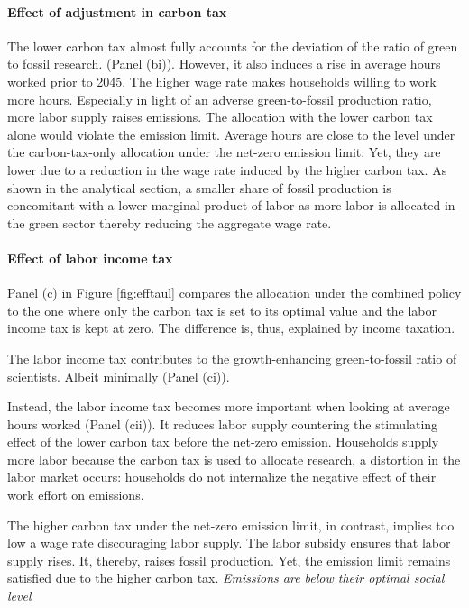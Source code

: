 \paragraph{Effect of adjustment in carbon tax}
The lower carbon tax almost fully accounts for the deviation of the ratio of green to fossil research. (Panel (bi)). However, it also induces a rise in average hours worked prior to 2045. The higher wage rate makes households willing to work more hours. Especially in light of an adverse green-to-fossil production ratio, more labor supply raises emissions. The allocation with the lower carbon tax alone would violate the emission limit. 
Average hours are close to the level under the carbon-tax-only allocation under the net-zero emission limit. Yet, they are lower due to a reduction in the wage rate induced by the higher carbon tax. As shown in the analytical section, a smaller share of fossil production is concomitant with a lower marginal product of labor as more labor is allocated in the green sector thereby reducing the aggregate wage rate. 

\paragraph{Effect of labor income tax}

Panel (c) in Figure \ref{fig:efftaul} compares the allocation under the combined policy to the one where only the carbon tax is set to its optimal value and the labor income tax is kept at zero. The difference is, thus, explained by income taxation. 

The labor income tax contributes to the growth-enhancing green-to-fossil ratio of scientists. Albeit minimally (Panel (ci)). 

Instead, the labor income tax becomes more important when looking at average hours worked (Panel (cii)). It reduces labor supply countering the stimulating effect of the lower carbon tax before the net-zero emission. Households supply more labor because the carbon tax is used to allocate research, a distortion in the labor market occurs: households do not internalize the negative effect of their work effort on emissions. 

The higher carbon tax under the net-zero emission limit, in contrast, implies too low a wage rate discouraging labor supply. The labor subsidy ensures that labor supply rises. It, thereby, raises fossil production. Yet, the emission limit remains satisfied due to the higher carbon tax.  \textit{Emissions are below their optimal social level}

